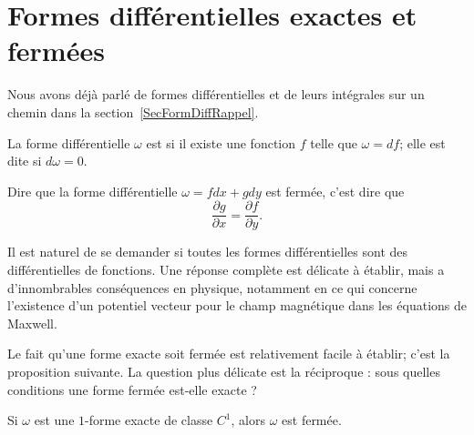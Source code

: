 
\section{Formes différentielles exactes et fermées}

Nous avons déjà parlé de formes différentielles et de leurs intégrales sur un chemin dans la section~\ref{SecFormDiffRappel}.

\begin{definition}  \label{DefEFKQmPs}
	La forme différentielle $\omega$ est  si il existe une fonction $f$ telle que $\omega=df$; elle est dite  si $d\omega=0$.
\end{definition}

Dire que la forme différentielle $\omega=fdx+gdy$ est fermée, c'est dire que
\begin{equation}
	\frac{ \partial g }{ \partial x }=\frac{ \partial f }{ \partial y }.
\end{equation}

Il est naturel de se demander si toutes les formes différentielles sont des différentielles de fonctions. Une réponse complète est délicate à établir, mais a d'innombrables conséquences en physique, notamment en ce qui concerne l'existence d'un potentiel vecteur pour le champ magnétique dans les équations de Maxwell.

Le fait qu'une forme exacte soit fermée est relativement facile à établir; c'est la proposition suivante. La question plus délicate est la réciproque : sous quelles conditions une forme fermée est-elle exacte ?
\begin{proposition}
	Si $\omega$ est une $1$-forme exacte de classe $C^1$, alors $\omega$ est fermée.
\end{proposition}

